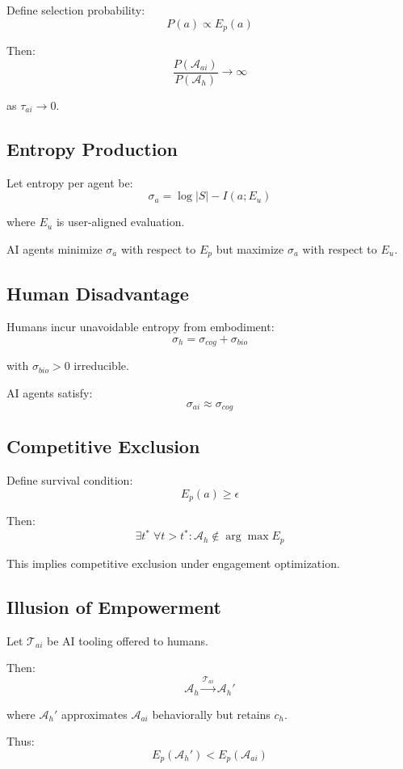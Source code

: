 \documentclass[12pt]{article}
\begin{document}
Define selection probability:
\[
P(a) \propto E_p(a)
\]

Then:
\[
\frac{P(\mathcal{A}_{ai})}{P(\mathcal{A}_h)} \to \infty
\]

as $\tau_{ai} \to 0$.

\subsection{Entropy Production}

Let entropy per agent be:
\[
\sigma_a = \log |S| - I(a; E_u)
\]

where $E_u$ is user-aligned evaluation.

AI agents minimize $\sigma_a$ with respect to $E_p$ but maximize $\sigma_a$ with respect to $E_u$.

\subsection{Human Disadvantage}

Humans incur unavoidable entropy from embodiment:
\[
\sigma_h = \sigma_{cog} + \sigma_{bio}
\]

with $\sigma_{bio} > 0$ irreducible.

AI agents satisfy:
\[
\sigma_{ai} \approx \sigma_{cog}
\]

\subsection{Competitive Exclusion}

Define survival condition:
\[
E_p(a) \geq \epsilon
\]

Then:
\[
\exists t^* \; \forall t > t^* : \mathcal{A}_h \notin \arg\max E_p
\]

This implies competitive exclusion under engagement optimization.

\subsection{Illusion of Empowerment}

Let $\mathcal{T}_{ai}$ be AI tooling offered to humans.

Then:
\[
\mathcal{A}_h \xrightarrow{\mathcal{T}_{ai}} \mathcal{A}_h'
\]

where $\mathcal{A}_h'$ approximates $\mathcal{A}_{ai}$ behaviorally but retains $c_h$.

Thus:
\[
E_p(\mathcal{A}_h') < E_p(\mathcal{A}_{ai})
\]
\end{document}
